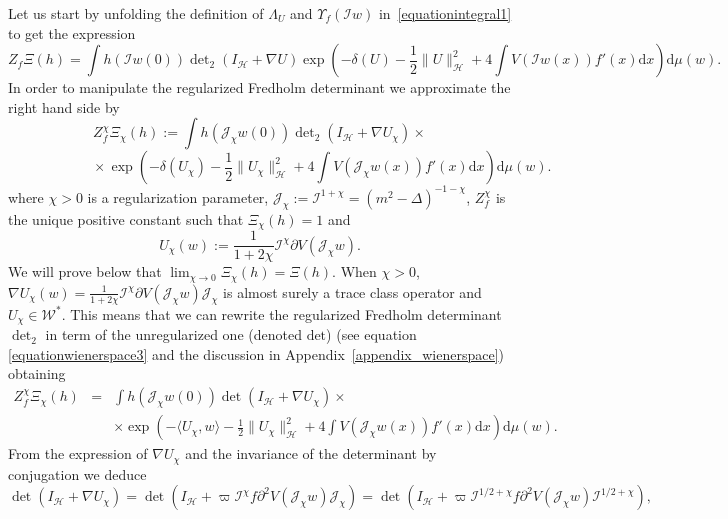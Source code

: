 \documentclass[a4paper,10pt]{article}
\newcommand{\assign}{:=}
\newcommand{\asterisk}{\mathord{*}}
\newcommand{\mathd}{\mathrm{d}}
\begin{document}
Let us start by unfolding the definition of $\Lambda_U$ and $\Upsilon_f
(\mathcal{I}w)$ in~{\eqref{equationintegral1}} to get the expression
\[ Z_f \Xi (h) = \int h (\mathcal{I}w (0)) \det\nolimits_2 (I_{\mathcal{H}} + \nabla U)
   \exp \left( - \delta (U) - \frac{1}{2} \|U\|^2_{\mathcal{H}} + 4 \int V
   (\mathcal{I}w (x)) f' (x) \mathd x \right) \mathd \mu (w) . \]
In order to manipulate the regularized Fredholm determinant we approximate the
right hand side by
\[ Z_f^{\chi} \Xi_{\chi} (h) \assign \int h (\mathcal{J}_{\chi} w (0)) \det\nolimits_2
   (I_{\mathcal{H}} + \nabla U_{\chi}) \times 
   \] \[\qquad\qquad\qquad\times \exp \left( - \delta (U_{\chi}) -
   \frac{1}{2} \|U_{\chi} \|^2_{\mathcal{H}} + 4 \int V (\mathcal{J}_{\chi} w
   (x)) f' (x) \mathd x \right) \mathd \mu (w) . \]
where $\chi > 0$ is a regularization parameter, $\mathcal{J}_{\chi} \assign
\mathcal{I}^{1 + \chi} = (m^2 - \Delta)^{- 1 - \chi}$, $Z^{\chi}_f$ is the
unique positive constant such that $\Xi_{\chi} (h) = 1$ and
\begin{equation}
  U_{\chi} (w) \assign \frac{1}{1 + 2 \chi} \mathcal{I}^{\chi} \partial V
  (\mathcal{J}_{\chi} w) . \label{eq:regularization}
\end{equation}
We will prove below that $\lim_{\chi \rightarrow 0} \Xi_{\chi} (h) = \Xi (h)$.
When $\chi > 0$, $\nabla U_{\chi} (w) = \frac{1}{1 + 2 \chi}
\mathcal{I}^{\chi} \partial V (\mathcal{J}_{\chi} w) \mathcal{J}_{\chi}$ is
almost surely a trace class operator and $U_{\chi} \in
\mathcal{W}^{\asterisk}$. This means that we can rewrite the regularized
Fredholm determinant $\det\nolimits_2$ in term of the unregularized one (denoted
$\text{det}$) (see equation {\eqref{equationwienerspace3}} and the discussion
in Appendix~\ref{appendix_wienerspace}) obtaining
\begin{equation}
  \begin{array}{lll}
    Z_f^{\chi} \Xi_{\chi} (h) & = & \int h (\mathcal{J}_{\chi} w (0)) \det
    (I_{\mathcal{H}} + \nabla U_{\chi}) \times\\
    &  & \times \exp \left( - \langle U_{\chi}, w \rangle - \frac{1}{2}
    \|U_{\chi} \|^2_{\mathcal{H}} + 4 \int V (\mathcal{J}_{\chi} w (x)) f' (x)
    \mathd x \right) \mathd \mu (w) .
  \end{array} \label{eq:heu1}
\end{equation}
From the expression of $\nabla U_{\chi}$ and the invariance of the determinant
by conjugation we deduce
\[ \det (I_{\mathcal{H}} + \nabla U_{\chi}) = \det (I_{\mathcal{H}} + \varpi
   \mathcal{I}^{\chi} f \partial^2 V (\mathcal{J}_{\chi} w)
   \mathcal{J}_{\chi}) = \det (I_{\mathcal{H}} + \varpi \mathcal{I}^{1 / 2 +
   \chi} f \partial^2 V (\mathcal{J}_{\chi} w) \mathcal{I}^{1 / 2 + \chi}), \]
\end{document}
